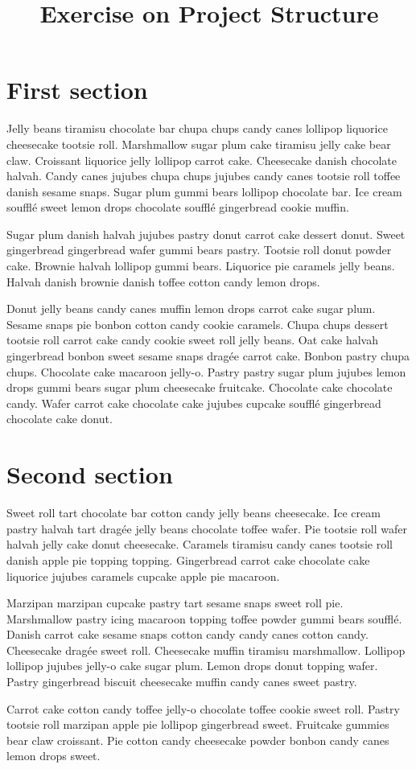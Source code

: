 \documentclass{article}
\title{Exercise on Project Structure}
\begin{document}
\maketitle
\tableofcontents

\newpage
\section{First section}
Jelly beans tiramisu chocolate bar chupa chups candy canes lollipop liquorice cheesecake tootsie roll. Marshmallow sugar plum cake tiramisu jelly cake bear claw. Croissant liquorice jelly lollipop carrot cake. Cheesecake danish chocolate halvah. Candy canes jujubes chupa chups jujubes candy canes tootsie roll toffee danish sesame snaps. Sugar plum gummi bears lollipop chocolate bar. Ice cream soufflé sweet lemon drops chocolate soufflé gingerbread cookie muffin.

Sugar plum danish halvah jujubes pastry donut carrot cake dessert donut. Sweet gingerbread gingerbread wafer gummi bears pastry. Tootsie roll donut powder cake. Brownie halvah lollipop gummi bears. Liquorice pie caramels jelly beans. Halvah danish brownie danish toffee cotton candy lemon drops.

Donut jelly beans candy canes muffin lemon drops carrot cake sugar plum. Sesame snaps pie bonbon cotton candy cookie caramels. Chupa chups dessert tootsie roll carrot cake candy cookie sweet roll jelly beans. Oat cake halvah gingerbread bonbon sweet sesame snaps dragée carrot cake. Bonbon pastry chupa chups. Chocolate cake macaroon jelly-o. Pastry pastry sugar plum jujubes lemon drops gummi bears sugar plum cheesecake fruitcake. Chocolate cake chocolate candy. Wafer carrot cake chocolate cake jujubes cupcake soufflé gingerbread chocolate cake donut.

\newpage
\section{Second section}

Sweet roll tart chocolate bar cotton candy jelly beans cheesecake. Ice cream pastry halvah tart dragée jelly beans chocolate toffee wafer. Pie tootsie roll wafer halvah jelly cake donut cheesecake. Caramels tiramisu candy canes tootsie roll danish apple pie topping topping. Gingerbread carrot cake chocolate cake liquorice jujubes caramels cupcake apple pie macaroon.

Marzipan marzipan cupcake pastry tart sesame snaps sweet roll pie. Marshmallow pastry icing macaroon topping toffee powder gummi bears soufflé. Danish carrot cake sesame snaps cotton candy candy canes cotton candy. Cheesecake dragée sweet roll. Cheesecake muffin tiramisu marshmallow. Lollipop lollipop jujubes jelly-o cake sugar plum. Lemon drops donut topping wafer. Pastry gingerbread biscuit cheesecake muffin candy canes sweet pastry. 

Carrot cake cotton candy toffee jelly-o chocolate toffee cookie sweet roll. Pastry tootsie roll marzipan apple pie lollipop gingerbread sweet. Fruitcake gummies bear claw croissant. Pie cotton candy cheesecake powder bonbon candy canes lemon drops sweet.
\end{document}
